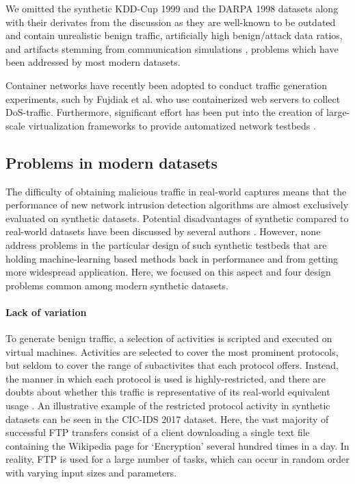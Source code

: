We omitted the synthetic KDD-Cup 1999 and the DARPA 1998 datasets along with their derivates from the discussion as they are well-known to be outdated and contain unrealistic benign traffic, artificially high benign/attack data ratios, and artifacts stemming from communication simulations \cite{tavallaee2009detailed,mchugh2000testing}, problems which have been addressed by most modern datasets.

Container networks have recently been adopted to conduct traffic generation experiments, such by Fujdiak et al. \cite{fujdiak2018ip} who use containerized web servers to collect DoS-traffic. Furthermore, significant effort has been put into the creation of large-scale virtualization frameworks to provide automatized network testbeds \cite{crussell2015minimega, badiger2018violet}.




\subsection{Problems in modern datasets}\label{SecD:problems}

The difficulty of obtaining malicious traffic in real-world captures means that the performance of new network intrusion detection algorithms are almost exclusively evaluated on synthetic datasets. Potential disadvantages of synthetic compared to real-world datasets have been discussed by several authors \cite{sommer_outside_2010,sperotto2009labeled}. However, none address problems in the particular design of such synthetic testbeds that are holding machine-learning based methods back in performance and from getting more widespread application. Here, we focused on this aspect and four design problems common among modern synthetic datasets.


\paragraph*{Lack of variation}\label{SecD:lackvar}

To generate benign traffic, a selection of activities is scripted and executed on virtual machines. Activities are selected to cover the most prominent protocols, but seldom to cover the range of subactivites that each protocol offers. Instead, the manner in which each protocol is used is highly-restricted, and there are doubts about whether this traffic is representative of its real-world equivalent usage \cite{sommer_outside_2010}. 
An illustrative example of the restricted protocol activity in synthetic datasets can be seen in the CIC-IDS 2017 dataset. Here, the vast majority of successful FTP transfers consist of a client downloading a single text file containing the Wikipedia page for `Encryption' several hundred times in a day. In reality, FTP is used for a large number of tasks, which can occur in random order with varying input sizes and parameters. 

